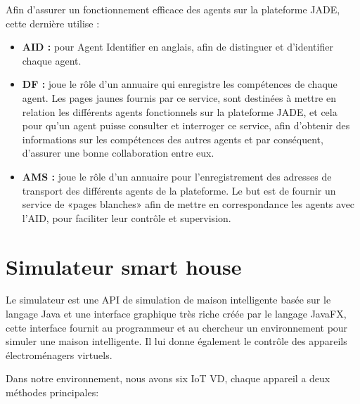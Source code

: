 Afin d’assurer un fonctionnement efficace des agents sur la plateforme JADE, cette dernière utilise :
\begin{itemize}
    \item \textbf{AID :} pour Agent Identifier en anglais, afin de distinguer et d’identifier chaque agent.
    \item \textbf{DF :} joue le rôle d’un annuaire qui enregistre les compétences de chaque agent. Les pages jaunes fournis par ce service, sont destinées à mettre en relation les différents agents fonctionnels sur la plateforme JADE, et cela pour qu’un agent puisse consulter et interroger ce service, afin d’obtenir des informations sur les compétences des autres agents et par conséquent, d’assurer une bonne collaboration entre eux.
    \item \textbf{AMS :} joue le rôle d’un annuaire pour l’enregistrement des adresses de transport des différents agents de la plateforme. Le but est de fournir un service de «pages blanches» afin de mettre en correspondance les agents avec l’AID, pour faciliter leur contrôle et supervision.
\end{itemize}
\section{Simulateur smart house}
Le simulateur  est une API de simulation de maison intelligente basée sur le langage Java et une interface graphique très riche créée par le langage JavaFX, cette interface fournit au programmeur et au chercheur un environnement pour simuler une maison intelligente. Il lui donne également le contrôle des appareils électroménagers virtuels.

Dans notre environnement, nous avons six IoT VD, chaque appareil a deux méthodes principales:

